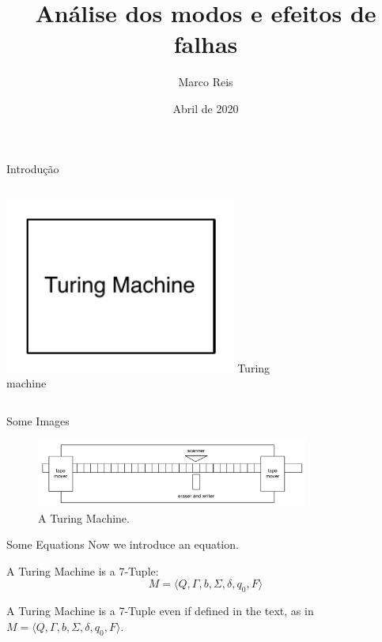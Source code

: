 \documentclass[aspectratio=169]{beamer}
\title              {Análise dos modos e efeitos de falhas}
\author             {Marco Reis}
\institute          {Laboratório de Robótica e Sistemas Autônomos, Senai Cimatec}
\date               {Abril de 2020}
\begin{document}
\begin{frame}[t,plain]
    \titlepage
\end{frame}
\begin{frame}[c]{Introdução} 
    \begin{columns}[c]
            \includegraphics[width=0.8\textwidth]{block}
            Turing machine
    \end{columns}
\end{frame}
\begin{frame}[c]{Some Images}
    \begin{figure}
        \includegraphics[width=0.8\textwidth]{turingmachine}
        \caption{A Turing Machine.}
    \end{figure}
\end{frame}
\begin{frame}[c]{Some Equations}
Now we introduce an equation.
    \begin{theorem}
    A Turing Machine is a 7-Tuple:
        \begin{equation}
        \label{eq:turi}
            M = \langle Q, \Gamma, b, \Sigma, \delta, q_0, F \rangle
        \end{equation}
    \end{theorem}
A Turing Machine is a 7-Tuple even if defined in the text, as in $M = \langle Q, \Gamma, b, \Sigma, \delta, q_0, F \rangle$.
\end{frame}
\end{document}
